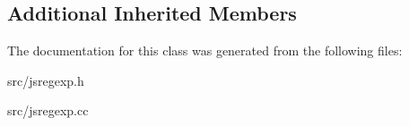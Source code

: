 \subsection*{Additional Inherited Members}


The documentation for this class was generated from the following files\+:\begin{DoxyCompactItemize}
\item 
src/jsregexp.\+h\item 
src/jsregexp.\+cc\end{DoxyCompactItemize}
